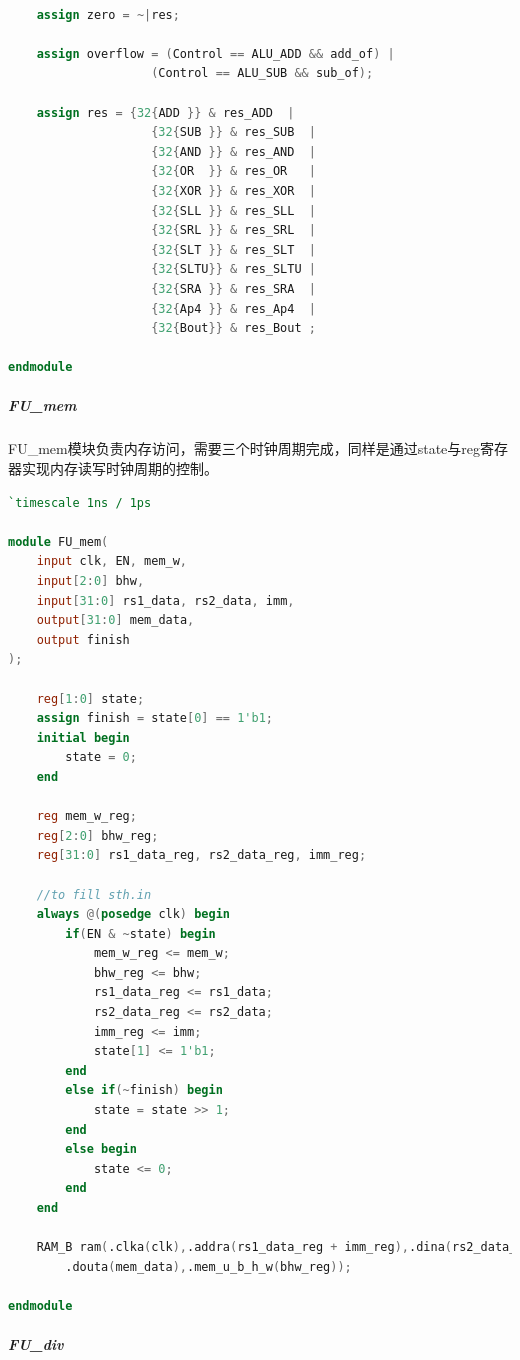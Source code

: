 \begin{lstlisting}[language = {verilog}]
	
	assign zero = ~|res;
	
	assign overflow = (Control == ALU_ADD && add_of) | 
					(Control == ALU_SUB && sub_of);
	
	assign res = {32{ADD }} & res_ADD  |
					{32{SUB }} & res_SUB  |
					{32{AND }} & res_AND  |
					{32{OR  }} & res_OR   |
					{32{XOR }} & res_XOR  |
					{32{SLL }} & res_SLL  |
					{32{SRL }} & res_SRL  |
					{32{SLT }} & res_SLT  |
					{32{SLTU}} & res_SLTU |
					{32{SRA }} & res_SRA  |
					{32{Ap4 }} & res_Ap4  |
					{32{Bout}} & res_Bout ;

endmodule
\end{lstlisting}

\subparagraph{FU\_mem} FU\_mem模块负责内存访问，需要三个时钟周期完成，同样是通过state与reg寄存器实现内存读写时钟周期的控制。
\begin{lstlisting}[language = {verilog}]
`timescale 1ns / 1ps

module FU_mem(
	input clk, EN, mem_w,
	input[2:0] bhw,
	input[31:0] rs1_data, rs2_data, imm,
	output[31:0] mem_data,
	output finish
);

	reg[1:0] state;
	assign finish = state[0] == 1'b1;
	initial begin
		state = 0;
	end

	reg mem_w_reg;
	reg[2:0] bhw_reg;
	reg[31:0] rs1_data_reg, rs2_data_reg, imm_reg;

	//to fill sth.in
	always @(posedge clk) begin
		if(EN & ~state) begin
			mem_w_reg <= mem_w;
			bhw_reg <= bhw;
			rs1_data_reg <= rs1_data;
			rs2_data_reg <= rs2_data;
			imm_reg <= imm;
			state[1] <= 1'b1;
		end
		else if(~finish) begin
			state = state >> 1;
		end
		else begin
			state <= 0;
		end
	end

	RAM_B ram(.clka(clk),.addra(rs1_data_reg + imm_reg),.dina(rs2_data_reg),.wea(mem_w_reg),
		.douta(mem_data),.mem_u_b_h_w(bhw_reg));

endmodule
\end{lstlisting}

\subparagraph{FU\_div}

